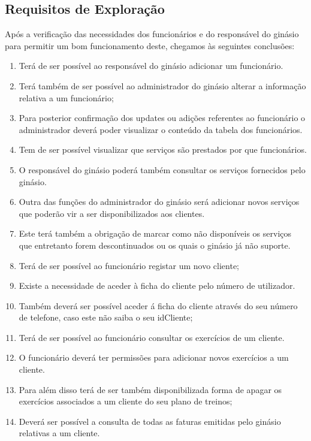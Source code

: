 \subsection{Requisitos de Exploração}
\label{subsec:requisitos}
Após a verificação das necessidades dos funcionários e do responsável do ginásio para permitir um bom funcionamento deste, chegamos às seguintes conclusões:

\begin{enumerate} 
    \item Terá de ser possível ao responsável do ginásio adicionar um funcionário.
    \item Terá também  de ser possível ao administrador do ginásio alterar a informação relativa a um funcionário;
    \item Para posterior confirmação dos updates ou adições referentes ao funcionário o administrador deverá poder visualizar o conteúdo da tabela dos funcionários.
    \item Tem de ser possível visualizar que serviços são prestados por que funcionários. 
    \item O responsável do ginásio poderá também consultar os serviços fornecidos pelo ginásio.
    \item Outra das funções do administrador do ginásio será adicionar novos serviços que poderão vir a ser disponibilizados aos clientes.
    \item Este terá também a obrigação de marcar como não disponíveis os serviços que entretanto forem descontinuados ou os quais o ginásio já não suporte.
    \item Terá de ser possível ao funcionário registar um novo cliente;
    \item Existe a necessidade de aceder à ficha do cliente pelo número de utilizador.
    \item Também deverá ser possível aceder á ficha do cliente através do seu número de telefone, caso este não saiba o seu idCliente;
    \item Terá de ser possível ao funcionário consultar os exercícios de um cliente.
    \item O funcionário deverá ter permissões para adicionar novos exercícios a um cliente.
    \item Para além disso terá de ser também disponibilizada forma de apagar os exercícios associados a um cliente do seu plano de treinos;
    \item Deverá ser possível a consulta de todas as faturas emitidas pelo ginásio relativas a um cliente.

\end{enumerate}
